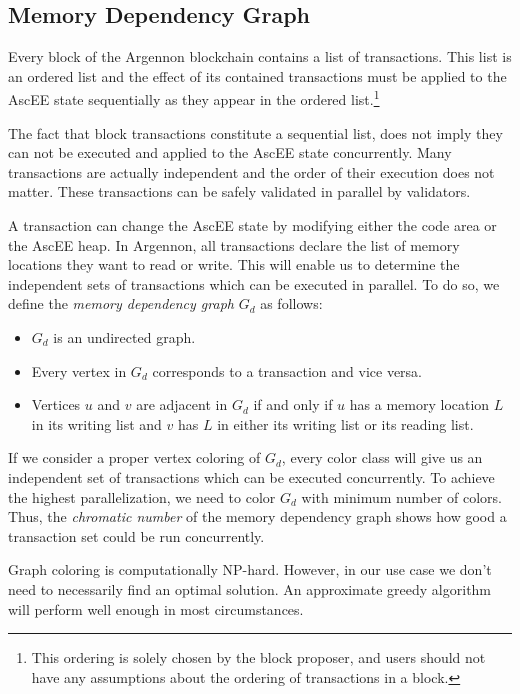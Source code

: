 

\subsection{Memory Dependency Graph}\label{subsec:memory-dependency-graph}

Every block of the Argennon blockchain contains a list of transactions. This list is an ordered list and the
effect of its contained transactions must be applied to the AscEE state sequentially as they appear in the ordered
list.\footnote{This ordering is solely chosen by the block proposer, and users should not have any assumptions about
the ordering of transactions in a block.}

The fact that block transactions constitute a sequential list, does not imply they can not be executed and applied
to the AscEE state concurrently. Many transactions are actually independent and the order of their execution does not
matter. These transactions can be safely validated in parallel by validators.

A transaction can change the AscEE state by modifying either the code area or the AscEE heap. In Argennon, all
transactions declare the list of memory locations they want to read or write. This will enable us to determine the
independent sets of transactions which can be executed in parallel. To do so, we define the \emph{memory dependency
graph} \(G_d\) as follows:

\begin{itemize}
    \item \(G_d\) is an undirected graph.
    \item Every vertex in \(G_d\) corresponds to a transaction and vice versa.
    \item Vertices \(u\) and \(v\) are adjacent in \(G_d\) if and only if \(u\) has a memory location \(L\) in its
    writing list and \(v\) has \(L\) in either its writing list or its reading list.
\end{itemize}

If we consider a proper vertex coloring of \(G_d\), every color class will give us an independent set of
transactions which can be executed concurrently. To achieve the highest parallelization, we need to color \(G_d\)
with minimum number of colors. Thus, the \emph{chromatic number} of the memory dependency graph shows how good a
transaction set could be run concurrently.

Graph coloring is computationally NP-hard. However, in our use case we don't need to necessarily find an optimal
solution. An approximate greedy algorithm will perform well enough in most circumstances.

